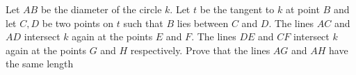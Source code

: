 Let $AB$ be the diameter of the circle $k$. Let $t$ be the tangent to $k$ at point $B$ and
let $C,D$ be two points on $t$ such that $B$ lies between $C$ and $D$.
The lines $AC$ and $AD$ intersect $k$ again at the points $E$ and $F$.
The lines $DE$ and $CF$ intersect $k$ again at the points $G$ and $H$ respectively.
Prove that the lines $AG$ and $AH$ have the same length